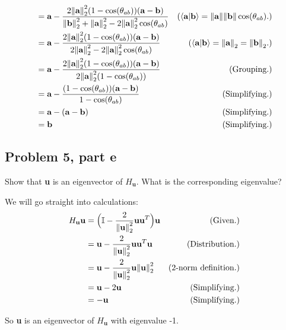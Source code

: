\begin{solution}
{\begin{align*}
        &= \textbf{a}- \frac{2\norm{\textbf{a}}_2^2 (1 - \cos(\theta_{ab}))(\textbf{a} - \textbf{b})}{\norm{\textbf{b}}_2^2 + \norm{\textbf{a}}_2^2 - 2\norm{\textbf{a}}_2^2\cos(\theta_{ab})} &(\braket{\textbf{a}}{\textbf{b}} = \norm{\textbf{a}}\norm{\textbf{b}}\cos(\theta_{ab}).)\\
        &= \textbf{a}- \frac{2\norm{\textbf{a}}_2^2 (1 - \cos(\theta_{ab}))(\textbf{a} - \textbf{b})}{2\norm{\textbf{a}}_2^2 - 2\norm{\textbf{a}}_2^2\cos(\theta_{ab})} &(\braket{\textbf{a}}{\textbf{b}} = \norm{\textbf{a}}_2 = \norm{\textbf{b}}_2.)\\
        &= \textbf{a}- \frac{2\norm{\textbf{a}}_2^2 (1 - \cos(\theta_{ab}))(\textbf{a} - \textbf{b})}{2\norm{\textbf{a}}_2^2(1 - \cos(\theta_{ab}))} &\text{(Grouping.)}\\
        &= \textbf{a}- \frac{(1 - \cos(\theta_{ab}))(\textbf{a} - \textbf{b})}{1 - \cos(\theta_{ab})} &\text{(Simplifying.)}\\
        &= \textbf{a} - (\textbf{a} - \textbf{b}) &\text{(Simplifying.)}\\
        &= \textbf{b} &\text{(Simplifying.)}
    \end{align*}
    \vspace{-10mm}
    \alignbreak
}%
\end{solution}

\newpage
\subsection{Problem 5, part e}
Show that \textbf{u} is an eigenvector of $H_\textbf{u}$. What is the corresponding eigenvalue?
\partbreak
\begin{solution}

    We will go straight into calculations:
    \alignbreak
    \begin{align*}
        H_\textbf{u}\textbf{u} &= \Big(\mathbb{I} - \frac{2}{\norm{\textbf{u}}_2^2}\textbf{u}\textbf{u}^T\Big)\textbf{u} &\text{(Given.)}\\
        &= \textbf{u} - \frac{2}{\norm{\textbf{u}}_2^2}\textbf{u}\textbf{u}^T\textbf{u} &\text{(Distribution.)}\\
        &= \textbf{u} - \frac{2}{\norm{\textbf{u}}_2^2}\textbf{u}\norm{\textbf{u}}_2^2 &\text{(2-norm definition.)}\\
        &= \textbf{u} - 2\textbf{u} &\text{(Simplifying.)}\\
        &= -\textbf{u} &\text{(Simplifying.)}
    \end{align*}
    \alignbreak

    So \textbf{u} is an eigenvector of $H_\textbf{u}$ with eigenvalue -1.
\end{solution}

